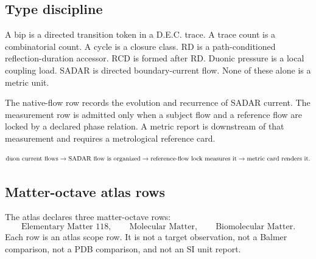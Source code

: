 \subsection{Type discipline}

A bip is a directed transition token in a D.E.C. trace.  A trace count is a combinatorial count.  A cycle is a closure class.  RD is a path-conditioned reflection-duration accessor.  RCD is formed after RD.  Duonic pressure is a local coupling load.  SADAR is directed boundary-current flow.  None of these alone is a metric unit.

The native-flow row records the evolution and recurrence of SADAR current.  The measurement row is admitted only when a subject flow and a reference flow are locked by a declared phase relation.  A metric report is downstream of that measurement and requires a metrological reference card.

\[
\text{duon current flows}
\to
\mathrm{SADAR}\text{ flow is organized}
\to
\text{reference-flow lock measures it}
\to
\text{metric card renders it}.
\]

\subsection{Matter-octave atlas rows}

The atlas declares three matter-octave rows:
\[
\text{Elementary Matter 118},
\qquad
\text{Molecular Matter},
\qquad
\text{Biomolecular Matter}.
\]
Each row is an atlas scope row.  It is not a target observation, not a Balmer comparison, not a PDB comparison, and not an SI unit report.

